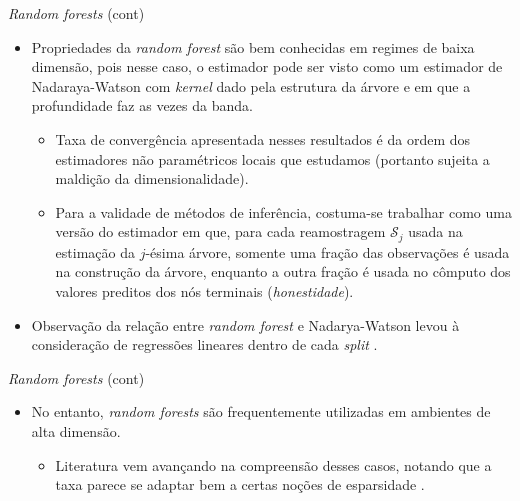 \documentclass[11pt]{beamer}
\begin{document}
\begin{frame}{\textit{Random forests} (cont)}
	\begin{itemize}
			\item Propriedades da \textit{random forest} são bem conhecidas em regimes de baixa dimensão, pois nesse caso, o estimador pode ser visto como um estimador de Nadaraya-Watson com \textit{kernel} dado pela estrutura da árvore e em que a profundidade faz as vezes da banda.
		\begin{itemize}
			\item Taxa de convergência apresentada nesses resultados é da ordem dos estimadores não paramétricos locais que estudamos (portanto sujeita a maldição da dimensionalidade).
			\item Para a validade de métodos de inferência, costuma-se trabalhar como uma versão do estimador em que, para cada reamostragem $\mathcal{S}_j$ usada na estimação da $j$-ésima árvore, somente uma fração das observações é usada na construção da árvore, enquanto a outra fração é usada no cômputo dos valores preditos dos nós terminais (\textit{honestidade}).
		
		\end{itemize}
	 	\item Observação da relação entre \textit{random forest} e Nadarya-Watson levou à consideração de regressões lineares dentro de cada \textit{split} \citep{Friedberg2021}.
	
	\end{itemize}
\end{frame}

\begin{frame}{\textit{Random forests} (cont)}
\begin{itemize}
 	\item No entanto, \textit{random forests} são frequentemente utilizadas em ambientes de alta dimensão.
	\begin{itemize}
		\item Literatura vem avançando na compreensão desses casos, notando que a taxa parece se adaptar bem a certas noções de esparsidade \citep{syrgkanis2020estimation}.
	\end{itemize}
\end{itemize}
\end{frame}
\end{document}
